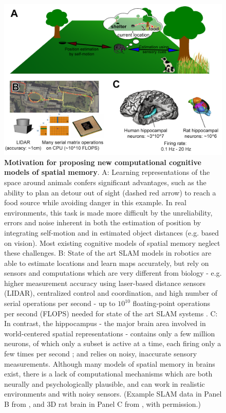 \begin{figure}[h]
	\centering
	\includegraphics[width=\textwidth]{img/motivation}
	\caption[Motivation for proposing new computational cognitive models of spatial memory]{\textbf{Motivation for proposing new computational cognitive models of spatial memory}. A: Learning representations of the space around animals confers significant advantages, such as the ability to plan an detour out of sight (dashed red arrow) to reach a food source while avoiding danger in this example. In real environments, this task is made more difficult by the unreliability, errors and noise inherent in both the estimation of position by integrating self-motion and in estimated object distances (e.g. based on vision). Most existing cognitive models of spatial memory neglect these challenges. B: State of the art SLAM models in robotics are able to estimate locations and learn maps accurately, but rely on sensors and computations which are very different from biology - e.g. higher measurement accuracy using laser-based distance sensors (LIDAR), centralized control and coordination, and high number of serial operations per second - up to $10^{10}$ floating-point operations per second (FLOPS) needed for state of the art SLAM systems \citep{machado2013evaluation}. C: In contrast, the hippocampus - the major brain area involved in world-centered spatial representations - contains only a few million neurons, of which only a subset is active at a time, each firing only a few times per second \citep{rapp1996preserved,vsimic1997volume}; and relies on noisy, inaccurate sensory measurements. Although many models of spatial memory in brains exist, there is a lack of computational mechanisms which are both neurally and psychologically plausible, and can work in realistic environments and with noisy sensors. (Example SLAM data in Panel B from \citep{newman2011describing}, and 3D rat brain in Panel C from \citep{calabrese2013ontology}, with permission.)} 
	\label{fig:motivation}
\end{figure}

